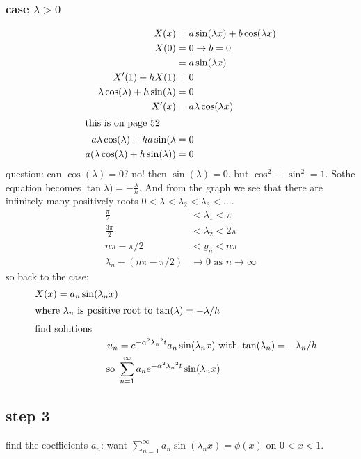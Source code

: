 \documentclass{article}
\begin{document}
\subsubsection*{case $\lambda>0$}
\begin{align*}
  X(x)&=a\sin(\lambda x)+b\cos(\lambda x)\\
  X(0)&=0\to b=0\\
  &=a\sin(\lambda x)\\
  X'(1)+hX(1)&=0\\
  \lambda\cos(\lambda)+h\sin(\lambda)&=0\\
  X'(x)&=a\lambda\cos(\lambda x)\\
  \intertext{this is on page 52}
  a\lambda\cos(\lambda)+ha\sin(\lambda&=0\\
  a(\lambda\cos(\lambda)+h\sin(\lambda))&=0\\
\end{align*}
question: can $\cos(\lambda)=0$? no! then $\sin(\lambda)=0$. but $\cos^2+\sin^2=1$. Sothe equation becomes $\tan\lambda)=-\frac{\lambda}{h}$. And from the graph we see that there are infinitely many positively roots $0<\lambda<\lambda_2<\lambda_3<\dots$.
\begin{align*}
  \frac{\pi}{2}&<\lambda_1<\pi\\
  \frac{3\pi}{2}&<\lambda_2<2\pi\\
  n\pi-\pi/2&<y_n<n\pi\\
  \lambda_n-(n\pi-\pi/2)&\to0 \text{ as } n\to\infty
\end{align*}
so back to the case:
\begin{align*}
  X(x)=a_n\sin(\lambda_nx)\\
  \intertext{where $\lambda_n$ is positive root to $\tan(\lambda)=-\lambda/h$}
  \intertext{find solutions}
  u_n&=e^{-\alpha^2{\lambda_n}^2t}a_n\sin(\lambda_nx)\text{ with }\tan(\lambda_n)=-\lambda_n/h\\
  \text{so }&\sum\limits_{n=1}^\infty{a_ne^{-\alpha^2{\lambda_n}^2t}\sin(\lambda_nx)}
\end{align*}
\subsection*{step 3}
find the coefficients $a_n$: want $\sum\limits_{n=1}^\infty{a_n\sin(\lambda_nx)}=\phi(x)$ on $0<x<1$.
\end{document}
